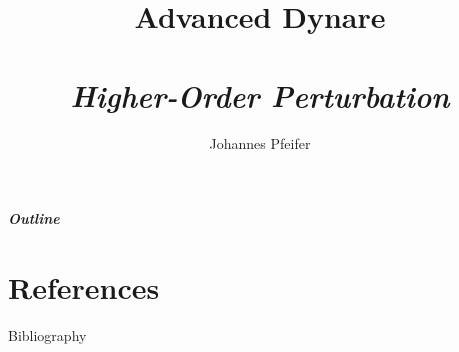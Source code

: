 \documentclass[handout,usepdftitle=false,xcolor=dvipsnames,aspectratio=169]{beamer}
\begin{document}


\title[]{\textbf{Advanced Dynare\\}
\\
\emph{Higher-Order Perturbation}
}

\author{Johannes Pfeifer}


\maketitle
%
\begin{frame}
\frametitle{Outline}
    \tableofcontents%
\end{frame}





\part{References}

\begin{frame}[allowframebreaks]{Bibliography}
\printbibliography
\end{frame}
\end{document}
